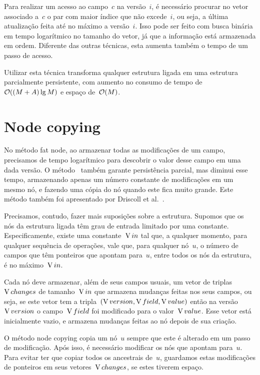 \documentclass[main.tex]{subfiles}
\begin{document}
Para realizar um acesso ao campo~$c$ na versão~$i$, é necessário procurar no vetor associado a~$c$ o par com maior índice que não excede~$i$, ou seja, a última atualização feita até no máximo a versão~$i$. Isso pode ser feito com busca binária em tempo logarítmico no tamanho do vetor, já que a informação está armazenada em ordem. Diferente das outras técnicas, esta aumenta também o tempo de um passo de acesso.

Utilizar esta técnica transforma qualquer estrutura ligada em uma estrutura parcialmente persistente, com aumento no consumo de tempo de~$\mathcal{O}((M+A) \lg{M})$ e espaço de~$\mathcal{O}(M)$.

\section{Node copying} \label{sec:nodecopying}

No método fat node, ao armazenar todas as modificações de um campo, precisamos de tempo logarítmico para descobrir o valor desse campo em uma dada versão. O método~ também garante persistência parcial, mas diminui esse tempo, armazenando apenas um número constante de modificações em um mesmo nó, e fazendo uma cópia do nó quando este fica muito grande. Este método também foi apresentado por Driscoll et al.~\cite{DriscollSST1989}.

Precisamos, contudo, fazer mais suposições sobre a estrutura. Supomos que os nós da estrutura ligada têm grau de entrada limitado por uma constante. Especificamente, existe uma constante~$\operatorname{V}{in}$ tal que, a qualquer momento, para qualquer sequência de operações, vale que, para qualquer nó~$u$, o número de campos que têm ponteiros que apontam para~$u$, entre todos os nós da estrutura, é no máximo~$\operatorname{V}{in}$.

\newcommand{\changes}{\V{changes}}
\newcommand{\parents}{\V{parents}}
\newcommand{\ts}{\mathcal{T}}
\newcommand{\cp}{\V{copy}}
\newcommand{\version}{\V{version}}
\newcommand{\entry}{\V{entry}}

Cada nó deve armazenar, além de seus campos usuais, um vetor de triplas~$\operatorname{V}{changes}$ de tamanho~$\operatorname{V}{in}$ que armazena mudanças feitas nos seus campos, ou seja, se este vetor tem a tripla~${(\operatorname{V}{version}, \operatorname{V}{field}, \operatorname{V}{value})}$ então na versão~$\operatorname{V}{version}$ o campo~$\operatorname{V}{field}$ foi modificado para o valor~$\operatorname{V}{value}$. Esse vetor está inicialmente vazio, e armazena mudanças feitas ao nó depois de sua criação.

O método node copying copia um nó~$u$ sempre que este é alterado em um passo de modificação. Após isso, é necessário modificar os nós que apontam para~$u$. Para evitar ter que copiar todos os ancestrais de~$u$, guardamos estas modificações de ponteiros em seus vetores~$\changes$, se estes tiverem espaço.
\end{document}
